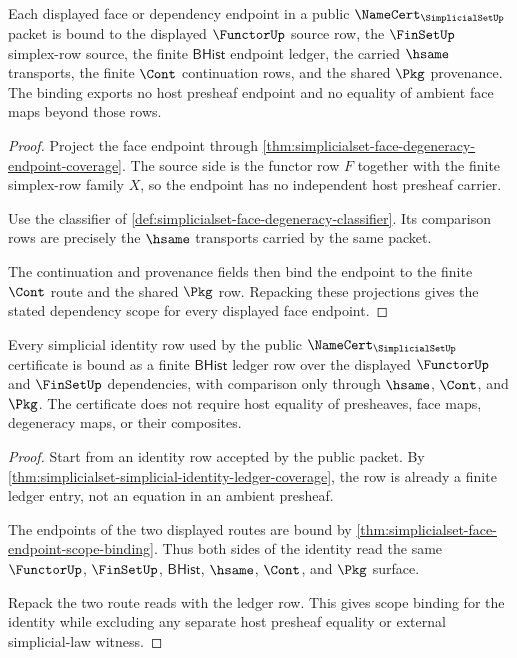 \begin{theorem}
\label{thm:simplicialset-face-endpoint-scope-binding}
Each displayed face or dependency endpoint in a public
$\NameCert_{\SimplicialSetUp}$ packet is bound to the displayed
$\FunctorUp$ source row, the $\FinSetUp$ simplex-row source, the finite
$\mathsf{BHist}$ endpoint ledger, the carried $\hsame$ transports, the
finite $\Cont$ continuation rows, and the shared $\Pkg$ provenance. The
binding exports no host presheaf endpoint and no equality of ambient face
maps beyond those rows.
\end{theorem}
\begin{proof}
Project the face endpoint through
\autoref{thm:simplicialset-face-degeneracy-endpoint-coverage}. The source
side is the functor row $F$ together with the finite simplex-row family $X$,
so the endpoint has no independent host presheaf carrier.

Use the classifier of
\autoref{def:simplicialset-face-degeneracy-classifier}. Its comparison rows
are precisely the $\hsame$ transports carried by the same packet.

The continuation and provenance fields then bind the endpoint to the finite
$\Cont$ route and the shared $\Pkg$ row. Repacking these projections gives
the stated dependency scope for every displayed face endpoint.
\end{proof}

\begin{theorem}
\label{thm:simplicialset-identity-ledger-scope-binding}
Every simplicial identity row used by the public
$\NameCert_{\SimplicialSetUp}$ certificate is bound as a finite
$\mathsf{BHist}$ ledger row over the displayed $\FunctorUp$ and $\FinSetUp$
dependencies, with comparison only through $\hsame$, $\Cont$, and $\Pkg$.
The certificate does not require host equality of presheaves, face maps,
degeneracy maps, or their composites.
\end{theorem}
\begin{proof}
Start from an identity row accepted by the public packet. By
\autoref{thm:simplicialset-simplicial-identity-ledger-coverage}, the row is
already a finite ledger entry, not an equation in an ambient presheaf.

The endpoints of the two displayed routes are bound by
\autoref{thm:simplicialset-face-endpoint-scope-binding}. Thus both sides of
the identity read the same $\FunctorUp$, $\FinSetUp$, $\mathsf{BHist}$,
$\hsame$, $\Cont$, and $\Pkg$ surface.

Repack the two route reads with the ledger row. This gives scope binding for
the identity while excluding any separate host presheaf equality or external
simplicial-law witness.
\end{proof}

